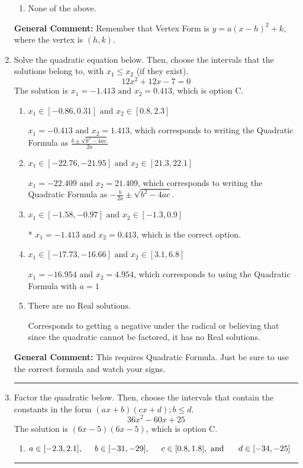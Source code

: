 \documentclass{extbook}[14pt]
\newcommand{\litem}[1]{\item #1

\rule{\textwidth}{0.4pt}}
\begin{document}
\begin{enumerate}
{\begin{enumerate}[label=\Alph*.]
\begin{multicols}{2}
\end{multicols}\item None of the above.\end{enumerate}
\textbf{General Comment:} Remember that Vertex Form is $y = a(x-h)^2+k$, where the vertex is $(h, k)$.
}
\litem{
Solve the quadratic equation below. Then, choose the intervals that the solutions belong to, with $x_1 \leq x_2$ (if they exist).
\[ 12x^{2} +12 x -7 = 0 \]The solution is \( x_1 = -1.413 \text{ and } x_2 = 0.413 \), which is option C.\begin{enumerate}[label=\Alph*.]
\item \( x_1 \in [-0.86, 0.31] \text{ and } x_2 \in [0.8, 2.3] \)

 $x_1 = -0.413 \text{ and } x_2 = 1.413$, which corresponds to writing the Quadratic Formula as $\frac{b \pm \sqrt{b^2 - 4ac}}{2a}$
\item \( x_1 \in [-22.76, -21.95] \text{ and } x_2 \in [21.3, 22.1] \)

 $x_1 = -22.409 \text{ and } x_2 = 21.409$, which corresponds to writing the Quadratic Formula as $-\frac{b}{2a} \pm \sqrt{b^2 - 4ac}$.
\item \( x_1 \in [-1.58, -0.97] \text{ and } x_2 \in [-1.3, 0.9] \)

* $x_1 = -1.413 \text{ and } x_2 = 0.413$, which is the correct option.
\item \( x_1 \in [-17.73, -16.66] \text{ and } x_2 \in [3.1, 6.8] \)

 $x_1 = -16.954 \text{ and } x_2 = 4.954$, which corresponds to using the Quadratic Formula with $a=1$
\item \( \text{There are no Real solutions.} \)

Corresponds to getting a negative under the radical or believing that since the quadratic cannot be factored, it has no Real solutions.
\end{enumerate}

\textbf{General Comment:} This requires Quadratic Formula. Just be sure to use the correct formula and watch your signs.
}
\litem{
Factor the quadratic below. Then, choose the intervals that contain the constants in the form $(ax+b)(cx+d); b \leq d.$
\[ 36x^{2} -60 x + 25 \]The solution is \( (6x -5)(6x -5) \), which is option C.\begin{enumerate}[label=\Alph*.]
\item \( a \in [-2.3, 2.1], \hspace*{5mm} b \in [-31, -29], \hspace*{5mm} c \in [0.8, 1.8], \text{ and } \hspace*{5mm} d \in [-34, -25] \)


\end{enumerate}}
\end{enumerate}
\end{document}
